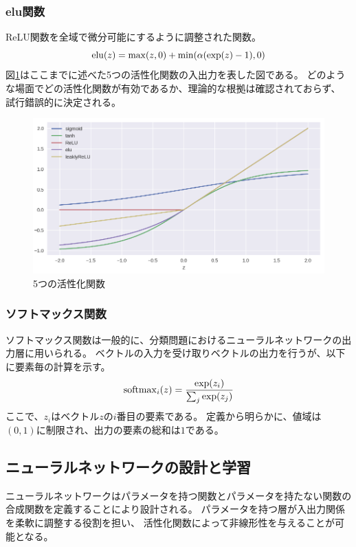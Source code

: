 \subsubsection{\rm elu\mc 関数}
ReLU関数を全域で微分可能にするように調整された関数。
\begin{equation}
    {\rm elu}(z) = \max(z,0) + \min(\alpha(\exp(z)-1), 0)
\end{equation}
図\ref{fig:activation}はここまでに述べた5つの活性化関数の入出力を表した図である。
どのような場面でどの活性化関数が有効であるか、理論的な根拠は確認されておらず、
試行錯誤的に決定される。
\begin{figure}
    \centering
    \includegraphics[width=13cm]{images/activations.png}
    \caption{5つの活性化関数}
    \label{fig:activation}
\end{figure}

\subsubsection{\mc ソフトマックス関数}
ソフトマックス関数は一般的に、分類問題におけるニューラルネットワークの出力層に用いられる。
ベクトルの入力を受け取りベクトルの出力を行うが、以下に要素毎の計算を示す。
\begin{equation}
   {\rm softmax}_i(z) = \frac{\exp(z_i)}{\sum_j \exp(z_j)} 
\end{equation}
ここで、\(z_i\)はベクトル\(z\)の\(i\)番目の要素である。
定義から明らかに、値域は\((0,1)\)に制限され、出力の要素の総和は\(1\)である。

\subsection{\mc ニューラルネットワークの設計と学習}
ニューラルネットワークはパラメータを持つ関数とパラメータを持たない関数の
合成関数を定義することにより設計される。
パラメータを持つ層が入出力関係を柔軟に調整する役割を担い、
活性化関数によって非線形性を与えることが可能となる。

